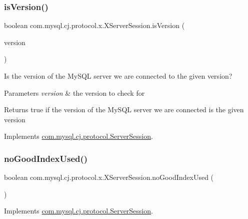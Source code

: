 \subsubsection{\texorpdfstring{is\+Version()}{isVersion()}}
{\footnotesize\ttfamily boolean com.\+mysql.\+cj.\+protocol.\+x.\+X\+Server\+Session.\+is\+Version (\begin{DoxyParamCaption}\item[{\mbox{\hyperlink{classcom_1_1mysql_1_1cj_1_1_server_version}{Server\+Version}}}]{version }\end{DoxyParamCaption})}

Is the version of the My\+S\+QL server we are connected to the given version?


\begin{DoxyParams}{Parameters}
{\em version} & the version to check for\\
\hline
\end{DoxyParams}
\begin{DoxyReturn}{Returns}
true if the version of the My\+S\+QL server we are connected is the given version 
\end{DoxyReturn}


Implements \mbox{\hyperlink{interfacecom_1_1mysql_1_1cj_1_1protocol_1_1_server_session_a021c8f114fce23443b9a8b26074b137a}{com.\+mysql.\+cj.\+protocol.\+Server\+Session}}.

\mbox{\label{classcom_1_1mysql_1_1cj_1_1protocol_1_1x_1_1_x_server_session_afb2168187353b13226a76ba9bf659a50}} 
\subsubsection{\texorpdfstring{no\+Good\+Index\+Used()}{noGoodIndexUsed()}}
{\footnotesize\ttfamily boolean com.\+mysql.\+cj.\+protocol.\+x.\+X\+Server\+Session.\+no\+Good\+Index\+Used (\begin{DoxyParamCaption}{ }\end{DoxyParamCaption})}



Implements \mbox{\hyperlink{interfacecom_1_1mysql_1_1cj_1_1protocol_1_1_server_session_affcc78ef2327efa3f81f7937ca3ca439}{com.\+mysql.\+cj.\+protocol.\+Server\+Session}}.

